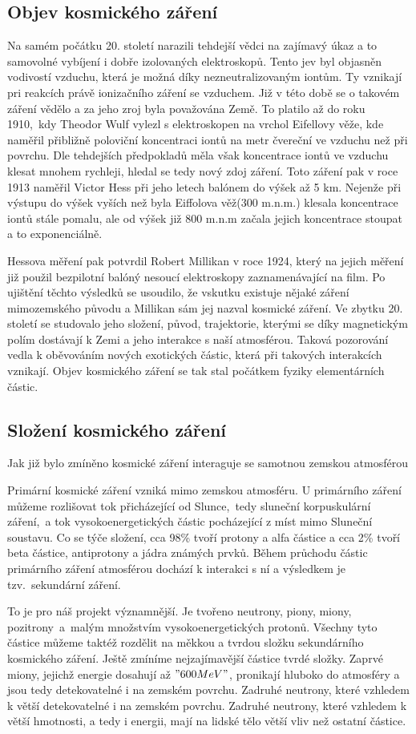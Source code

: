 \documentclass[12pt,a4paper]{article}
\begin{document}
\subsection*{Objev kosmického záření}
Na samém počátku 20. století narazili tehdejší vědci na zajímavý úkaz a to
samovolné vybíjení i dobře izolovaných elektroskopů. Tento jev byl objasněn
vodivostí vzduchu, která je možná díky nezneutralizovaným iontům. Ty vznikají
pri reakcích právě ionizačního záření se vzduchem. Již v této době se o takovém
záření vědělo a za jeho zroj byla považována Země. To platilo až do roku
1910,~kdy Theodor Wulf vylezl s elektroskopen na vrchol Eifellovy věže, kde
naměřil přibližně poloviční koncentraci iontů na metr čvereční ve vzduchu
než při povrchu. Dle tehdejších předpokladů měla však koncentrace iontů ve
vzduchu klesat mnohem rychleji, hledal se tedy nový zdoj záření. Toto záření
pak v roce 1913 naměřil Victor Hess při jeho letech balónem do výšek až 5 km.
Nejenže při výstupu do výšek vyších než byla Eiffolova věž(300 m.n.m.) klesala
koncentrace iontů stále pomalu, ale od výšek již 800 m.n.m začala jejich
koncentrace stoupat a to exponenciálně.\par
Hessova měření pak potvrdil Robert Millikan v roce 1924, který na jejich měření
již použil bezpilotní balóný nesoucí elektroskopy zaznamenávající na film.
Po ujištění těchto výsledků se usoudilo, že vskutku existuje nějaké záření
mimozemského původu a Millikan sám jej nazval kosmické záření. Ve zbytku
20. století se studovalo jeho složení, původ, trajektorie, kterými se díky
magnetickým polím dostávají k Zemi a jeho interakce s naší atmosférou. Taková
pozorování vedla k oběvováním nových exotických částic, která při takových
interakcích vznikají. Objev kosmického záření se tak stal počátkem fyziky
elementárních částic.\par
\subsection*{Složení kosmického záření}
Jak již bylo zmíněno kosmické záření interaguje se samotnou zemskou atmosférou

Primární kosmické záření vzniká mimo zemskou atmosféru. U primárního záření
můžeme rozlišovat tok přicházející od Slunce,~tedy sluneční korpuskulární
záření,~a tok vysokoenergetických částic pocházející z míst mimo Sluneční
soustavu. Co se týče složení, cca 98\% tvoří protony a alfa částice a cca 2\%
tvoří beta částice, antiprotony a jádra známých prvků. Během průchodu částic
primárního záření atmosférou dochází k interakci s ní a výsledkem je
tzv.~sekundární záření.\par
To je pro náš projekt významnější. Je tvořeno neutrony, piony, miony,
pozitrony~a~malým množstvím vysokoenergetických protonů. Všechny tyto částice
můžeme taktéž rozdělit na měkkou a tvrdou složku sekundárního kosmického záření.
Ještě zmíníme nejzajímavější částice tvrdé složky. Zaprvé miony, jejichž energie
dosahují až $"600 MeV"$, pronikají hluboko do atmosféry a jsou tedy
detekovatelné i na zemském povrchu. Zadruhé neutrony, které vzhledem k větší
detekovatelné i na zemském povrchu. Zadruhé neutrony, které vzhledem k větší
hmotnosti, a tedy i energii, mají na lidské tělo větší vliv než ostatní částice.\par
\end{document}
